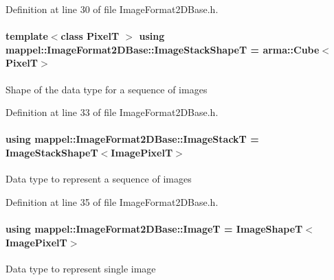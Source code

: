 Definition at line 30 of file Image\+Format2\+D\+Base.\+h.

\paragraph[{\texorpdfstring{Image\+Stack\+ShapeT}{ImageStackShapeT}}]{\setlength{\rightskip}{0pt plus 5cm}template$<$class PixelT $>$ using {\bf mappel\+::\+Image\+Format2\+D\+Base\+::\+Image\+Stack\+ShapeT} =  arma\+::\+Cube$<$PixelT$>$\hspace{0.3cm}{\ttfamily [inherited]}}\hypertarget{classmappel_1_1ImageFormat2DBase_ae2e123c8a5a5ab00f89eaea04d2431cb}{}\label{classmappel_1_1ImageFormat2DBase_ae2e123c8a5a5ab00f89eaea04d2431cb}
Shape of the data type for a sequence of images 

Definition at line 33 of file Image\+Format2\+D\+Base.\+h.

\paragraph[{\texorpdfstring{Image\+StackT}{ImageStackT}}]{\setlength{\rightskip}{0pt plus 5cm}using {\bf mappel\+::\+Image\+Format2\+D\+Base\+::\+Image\+StackT} =  {\bf Image\+Stack\+ShapeT}$<${\bf Image\+PixelT}$>$\hspace{0.3cm}{\ttfamily [inherited]}}\hypertarget{classmappel_1_1ImageFormat2DBase_a8f0276e94ff242fa4740a718642f5e14}{}\label{classmappel_1_1ImageFormat2DBase_a8f0276e94ff242fa4740a718642f5e14}
Data type to represent a sequence of images 

Definition at line 35 of file Image\+Format2\+D\+Base.\+h.

\paragraph[{\texorpdfstring{ImageT}{ImageT}}]{\setlength{\rightskip}{0pt plus 5cm}using {\bf mappel\+::\+Image\+Format2\+D\+Base\+::\+ImageT} =  {\bf Image\+ShapeT}$<${\bf Image\+PixelT}$>$\hspace{0.3cm}{\ttfamily [inherited]}}\hypertarget{classmappel_1_1ImageFormat2DBase_a667ea5016648958e507e7db8eaa041b0}{}\label{classmappel_1_1ImageFormat2DBase_a667ea5016648958e507e7db8eaa041b0}
Data type to represent single image 

